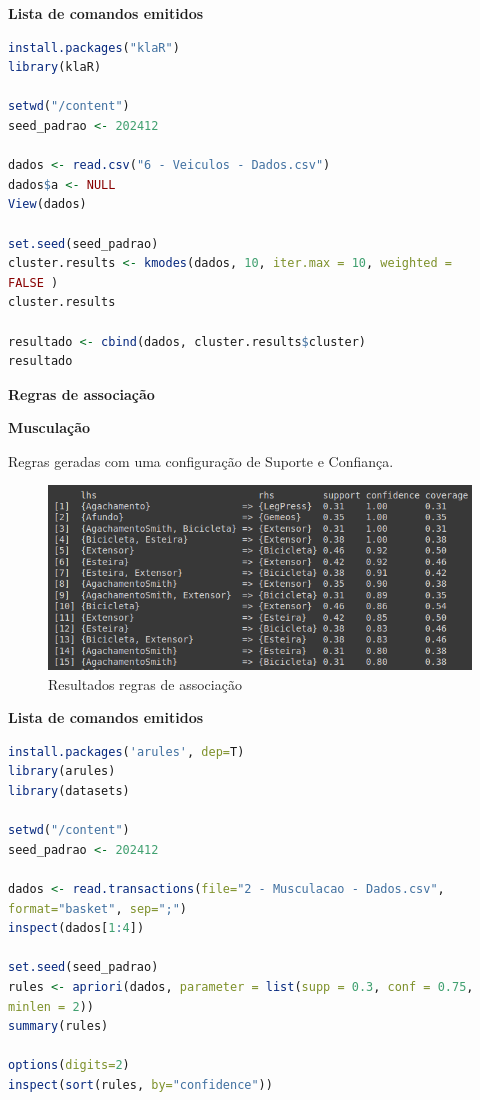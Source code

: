 \begin{center}
    \textbf{Lista de comandos emitidos}
\end{center}


\begin{lstlisting}[language=R, style=input]
install.packages("klaR")
library(klaR)

setwd("/content")
seed_padrao <- 202412

dados <- read.csv("6 - Veiculos - Dados.csv")
dados$a <- NULL
View(dados)

set.seed(seed_padrao)
cluster.results <- kmodes(dados, 10, iter.max = 10, weighted =
FALSE )
cluster.results

resultado <- cbind(dados, cluster.results$cluster)
resultado
\end{lstlisting}


\begin{adjustwidth}{1em}{}
\textbf{Regras de associação}
\end{adjustwidth}

\begin{center}
    \textbf{Musculação}
\end{center}

Regras geradas com uma configuração de Suporte e Confiança.


\begin{figure}[H]
\centering
\caption{Resultados regras de associação}
\includegraphics[width=\linewidth]{apendices/fig/8_IAA008_17.png}
\end{figure}

\begin{center}
    \textbf{Lista de comandos emitidos}
\end{center}


\begin{lstlisting}[language=R, style=input]
install.packages('arules', dep=T)
library(arules)
library(datasets)

setwd("/content")
seed_padrao <- 202412

dados <- read.transactions(file="2 - Musculacao - Dados.csv",
format="basket", sep=";")
inspect(dados[1:4])

set.seed(seed_padrao)
rules <- apriori(dados, parameter = list(supp = 0.3, conf = 0.75,
minlen = 2))
summary(rules)

options(digits=2)
inspect(sort(rules, by="confidence"))
\end{lstlisting}